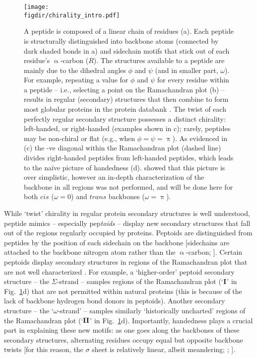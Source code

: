\documentclass[fleqn,10pt]{wlpeerj} %
\newcommand{\Fig}[1]{Fig.~\ref{#1}}
\newcommand{\figdir}{./figures}
\begin{document}
\begin{figure}[t!]
\centering
\texttt{[image: \\figdir/chirality\_intro.pdf]}
\caption{\label{fig:intro} A peptide is composed of a linear chain of residues (a). Each peptide is structurally distinguished into backbone atoms (connected by dark shaded bonds in a) and sidechain motifs that stick out of each residue's $\upalpha$-carbon ($R$). The structures available to a peptide are mainly due to the dihedral angles $\phi$ and $\psi$ (and in smaller part, $\omega$). For example, repeating a value for $\phi$ and $\psi$ for every residue within a peptide -- i.e., selecting a point on the Ramachandran plot (b) -- results in regular (secondary) structures that then combine to form most globular proteins in the protein databank \citep{Berman2000}. The twist of each perfectly regular secondary structure possesses a distinct chirality: left-handed, or right-handed (examples shown in c); rarely, peptides may be non-chiral or flat (e.g., when $\phi=\psi=\uppi$). As evidenced in (c) the -ve diagonal within the Ramachandran plot (dashed line) divides right-handed peptides from left-handed peptides, which leads to the na{\"i}ve picture of handedness (d). \cite{Zacharias2013} showed that this picture is over simplistic, however an in-depth characterization of the backbone in all regions was not performed, and will be done here for both $cis$ ($\omega=0$) and $trans$ backbones ($\omega=\uppi$).}
\end{figure}

While `twist' chirality in regular protein secondary structures is well understood, peptide mimics -- especially pep\textit{toids} \citep{Sun2013} -- display new secondary structures that fall out of the regions regularly occupied by proteins. Peptoids are distinguished from peptides by the position of each sidechain on the backbone [sidechains are attached to the backbone nitrogen atom rather than the $\upalpha$-carbon; \cite{Sun2013}]. %
Certain peptoids display secondary structures in regions of the Ramachandran plot that are not well characterized  \citep{Sun2013,Goodman2007,Culf2010,Beke2006,Pohl2012,Zuckermann2009,Sun2013}. For example, a `higher-order' peptoid secondary structure -- the $\Sigma$-strand \citep{Mannige2015,Robertson2016} -- samples regions of the Ramachandran plot (`$\textrm{\textbf{I}}$' in \Fig{fig:intro}d) that are not permitted within natural proteins (this is because of the lack of backbone hydrogen bond donors in peptoids). Another secondary structure -- the `$\omega$-strand' \citep{Gorske2016} -- samples similarly `historically uncharted' regions of the Ramachandran plot (`$\textrm{\textbf{II}}$' in \Fig{fig:intro}d). Importantly, handedness plays a crucial part in explaining these new motifs: as one goes along the backbones of these secondary structures, alternating residues occupy equal but opposite backbone twists [for this reason, the $\sigma$ sheet is relatively linear, albeit meandering; \cite{Mannige2015}; \cite{MannigeKunduWhitelam2016}].
\end{document}
